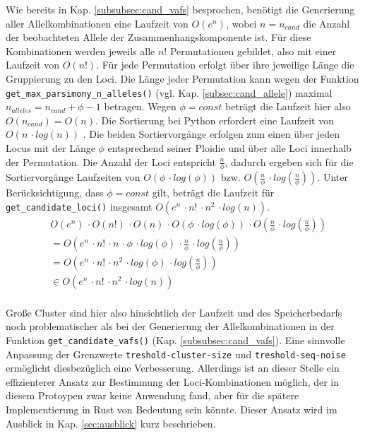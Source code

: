 Wie bereits in Kap. \ref{subsubsec:cand_vafs} besprochen, benötigt die Generierung aller Allelkombinationen eine Laufzeit von $ O(e^n) $, wobei $n = n_{cand}$ die Anzahl der beobachteten Allele der Zusammenhangskomponente ist. Für diese Kombinationen werden jeweils alle $n!$ Permutationen gebildet, also mit einer Laufzeit von $ O(n!) $. Für jede Permutation erfolgt über ihre jeweilige Länge die Gruppierung zu den Loci. Die Länge jeder Permutation kann wegen der Funktion \lstinline|get_max_parsimony_n_alleles()| (vgl. Kap. \ref{subsec:cand_allele}) maximal $ n_{alleles} = n_{cand} + \phi - 1 $ betragen. Wegen $\phi = const$ beträgt die Laufzeit hier also $O(n_{cand}) = O(n)$. Die Sortierung bei Python erfordert eine Laufzeit von $ O(n\, \cdotp log(n))$ \cite{python-sort}. Die beiden Sortiervorgänge erfolgen zum einen über jeden Locus mit der Länge $\phi$ entsprechend seiner Ploidie und über alle Loci innerhalb der Permutation. Die Anzahl der Loci entspricht $\frac{n}{\phi}$, dadurch ergeben sich für die Sortiervorgänge Laufzeiten von $ O(\phi\, \cdotp log(\phi)) $ bzw. $ O\left( \frac{n}{\phi}\, \cdotp log\left( \frac{n}{\phi}\right) \right) $. Unter Berücksichtigung, dass $\phi = const$ gilt, beträgt die Laufzeit für \lstinline|get_candidate_loci()| insgesamt $ O(e^n \, \cdotp n! \, \cdotp n^2 \, \cdotp log(n)) $.
\begin{equation} \label{eqn:4-21}
\tag{4-21}
\begin{aligned}
&\ {}O(e^n) \, \cdotp O(n!) \, \cdotp O(n) \, \cdotp O(\phi\, \cdotp log(\phi))\, \cdotp O\left( \frac{n}{\phi}\, \cdotp log\left( \frac{n}{\phi}\right) \right)  \\
&\ =O\left( e^n \, \cdotp n! \, \cdotp n\, \cdotp \phi\, \cdotp log(\phi)\, \cdotp  \frac{n}{\phi}\, \cdotp log\left( \frac{n}{\phi} \right)\right)   \\
&\ =O\left( e^n \, \cdotp n! \, \cdotp n^2 \, \cdotp log(\phi)\, \cdotp  log\left( \frac{n}{\phi} \right)\right)   \\
&\ \in O(e^n \, \cdotp n! \, \cdotp n^2 \, \cdotp log(n))
\end{aligned}
\end{equation}
\\
Große Cluster sind hier also hinsichtlich der Laufzeit und des Speicherbedarfs noch problematischer als bei der Generierung der Allelkombinationen in der Funktion \linebreak \lstinline|get_candidate_vafs()| (Kap. \ref{subsubsec:cand_vafs}). Eine sinnvolle Anpassung der Grenzwerte \linebreak \lstinline|treshold-cluster-size| und   \lstinline|treshold-seq-noise| ermöglicht diesbezüglich eine Verbesserung. Allerdings ist an dieser Stelle ein effizienterer Ansatz zur Bestimmung der Loci-Kombinationen möglich, der in diesem Protoypen zwar keine Anwendung fand, aber für die spätere Implementierung in Rust von Bedeutung sein könnte. Dieser Ansatz wird im Ausblick in Kap. \ref{sec:ausblick} kurz beschrieben.

